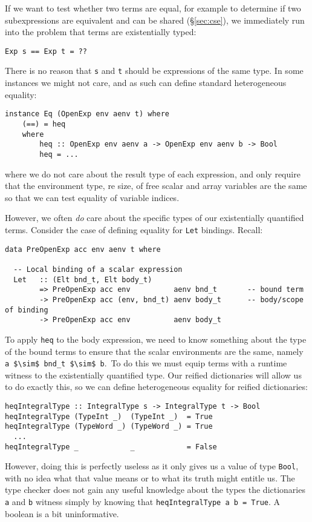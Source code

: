 If we want to test whether two terms are equal, for example to determine if two
subexpressions are equivalent and can be shared (\S\ref{sec:cse}), we
immediately run into the problem that terms are existentially typed:
%
\begin{lstlisting}[style=haskell]
Exp s == Exp t = ??
\end{lstlisting}
%
There is no reason that \texttt{s} and \texttt{t} should be expressions of the
same type. In some instances we might not care, and as such can define standard
heterogeneous equality:
%
\begin{lstlisting}[style=haskell]
instance Eq (OpenExp env aenv t) where
    (==) = heq
    where
        heq :: OpenExp env aenv a -> OpenExp env aenv b -> Bool
        heq = ...
\end{lstlisting}
%
where we do not care about the result type of each expression, and only require
that the environment type, re size, of free scalar and array variables are the
same so that we can test equality of variable indices.

However, we often \emph{do} care about the specific types of our existentially
quantified terms. Consider the case of defining equality for \texttt{Let}
bindings. Recall:
%
\begin{lstlisting}[style=haskell]
data PreOpenExp acc env aenv t where

  -- Local binding of a scalar expression
  Let   :: (Elt bnd_t, Elt body_t)
        => PreOpenExp acc env          aenv bnd_t       -- bound term
        -> PreOpenExp acc (env, bnd_t) aenv body_t      -- body/scope of binding
        -> PreOpenExp acc env          aenv body_t
\end{lstlisting}
%
To apply \texttt{heq} to the body expression, we need to know something about
the type of the bound terms to ensure that the scalar environments are the same,
namely \lstinline[mathescape]{a $\sim$ bnd_t $\sim$ b}.\footnotemark\ To do
this we must equip terms with a runtime witness to the existentially quantified
type. Our reified dictionaries will allow us to do exactly this, so we can
define heterogeneous equality for reified dictionaries:
%
%
\begin{lstlisting}[style=haskell]
heqIntegralType :: IntegralType s -> IntegralType t -> Bool
heqIntegralType (TypeInt _)  (TypeInt _)  = True
heqIntegralType (TypeWord _) (TypeWord _) = True
  ...
heqIntegralType _            _            = False
\end{lstlisting}
%
However, doing this is perfectly useless as it only gives us a value of type
\texttt{Bool}, with no idea what that value means or to what its truth might
entitle us. The type checker does not gain any useful knowledge about the types
the dictionaries \texttt{a} and \texttt{b} witness simply by knowing that
\lstinline{heqIntegralType a b = True}. A boolean is a bit uninformative.

